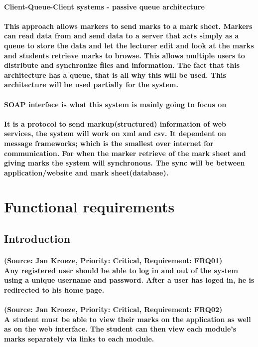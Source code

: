 \documentclass[12pt]{article}
\begin{document}
\paragraph{Client-Queue-Client systems - passive queue architecture}
\paragraph{This approach allows markers to send marks to a mark sheet. Markers can read data from and send data to a server that acts simply as a queue to store the data and let the lecturer edit and look at the marks and students retrieve marks to browse. This allows multiple users to distribute and synchronize files and information. The fact that this architecture has a queue, that is all why this will be used. This architecture will be used partially for the system. 
}
\paragraph{SOAP interface is what this system is mainly going to focus on }
\paragraph{It is a protocol to send markup(structured) information of web services, the system will work on xml and csv. It dependent on message frameworks; which is the smallest over internet for communication. For when the marker retrieve of the mark sheet and giving marks the system will synchronous. The sync will be between application/website and mark sheet(database).
}
  \section{Functional requirements}
  \subsection{Introduction}
  \paragraph{ (Source: Jan Kroeze, Priority: Critical, Requirement: FRQ01) \\
  Any registered user should be able to log in and out of the system using a unique username and password. After a user has loged in, he is redirected to his home page.}
  \paragraph{ (Source: Jan Kroeze, Priority: Critical, Requirement: FRQ02) \\
  A student must be able to view their marks on the application as well as on  the web interface. The student can then view each module's marks separately via links to each module. }
\end{document}

